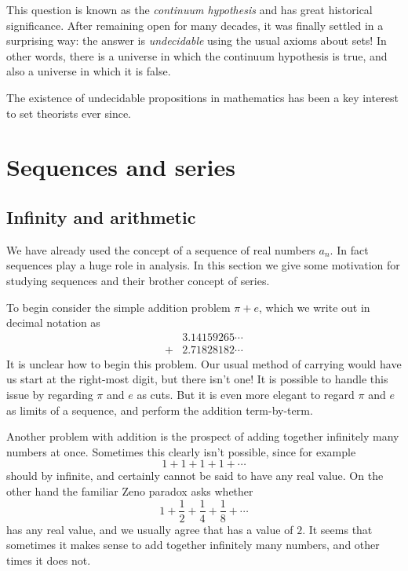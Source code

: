 \documentclass[11pt,oneside]{amsbook}
\theoremstyle{definition}
\theoremstyle{plain}
\theoremstyle{definition}
\theoremstyle{remark}
\numberwithin{equation}{section}
\numberwithin{figure}{section}
\begin{document}
This question is known as the \emph{continuum hypothesis} and has great historical significance. After remaining open for many decades, it was finally settled in a surprising way: the answer is \emph{undecidable} using the usual axioms about sets! In other words, there is a universe in which the continuum hypothesis is true, and also a universe in which it is false.

The existence of undecidable propositions in mathematics has been a key interest to set theorists ever since.


\chapter{Sequences and series}

\section{Infinity and arithmetic}
\label{sec:sequences}

We have already used the concept of a sequence of real numbers $a_n$. In fact sequences play a huge role in analysis. In this section we give some motivation for studying sequences and their brother concept of series.

To begin consider the simple addition problem $\pi+e$, which we write out in decimal notation as
\begin{align*}
&3.14159265\cdots\\
{}+&2.71828182\cdots
\end{align*}
It is unclear how to begin this problem. Our usual method of carrying would have us start at the right-most digit, but there isn't one! It is possible to handle this issue by regarding $\pi$ and $e$ as cuts. But it is even more elegant to regard $\pi$ and $e$ as limits of a sequence, and perform the addition term-by-term.

Another problem with addition is the prospect of adding together infinitely many numbers at once. Sometimes this clearly isn't possible, since for example 
\[1+1+1+1+\cdots
\]
should by infinite, and certainly cannot be said to have any real value. On the other hand the familiar Zeno paradox asks whether
\[1+\frac12+\frac14+\frac18+\cdots
\]
has any real value, and we usually agree that has a value of $2$. It seems that sometimes it makes sense to add together infinitely many numbers, and other times it does not.
\end{document}
